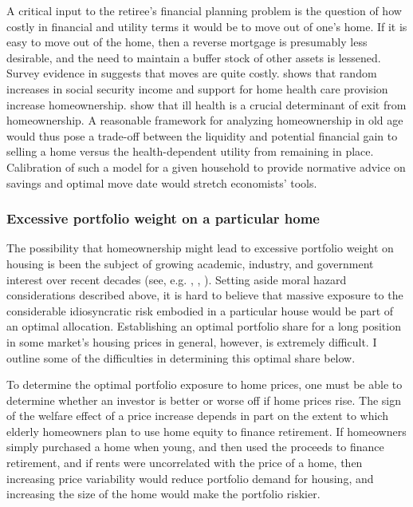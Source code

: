 \documentclass[12pt]{article}
\begin{document}
A critical input to the retiree's financial planning problem is the question of
how costly in financial and utility terms it would be to move out of one's home.
If it is easy to move out of the home, then a reverse mortgage is presumably
less desirable, and the need to maintain a buffer stock of other assets is
lessened.  Survey evidence in \textcite{AARP} suggests that moves are quite costly.
\textcite{engelhardtPerry} shows that random increases in social security income and support
for home health care provision increase homeownership. \textcite{CoileMilligan}
show that ill health is a crucial determinant of exit from homeownership.  A
reasonable framework for analyzing homeownership in old age would thus pose
a trade-off between the liquidity and potential financial gain to selling a home
versus the health-dependent utility from remaining in place.  Calibration of
such a model for a given household to provide normative advice on savings and
optimal move date would stretch economists' tools.

\subsubsection{Excessive portfolio weight on a particular home}

The possibility that homeownership might lead to excessive portfolio weight on
housing is been the subject of growing academic, industry, and government interest over
recent decades (see, e.g.  \textcite{FlavinYamashita}, \textcite{Brueckner},
\textcite{Bula}).  Setting aside moral hazard considerations described above,
it is hard to believe that massive exposure to the considerable idiosyncratic
risk embodied in a particular house would be part of an optimal allocation.
Establishing an optimal portfolio share for a long position in some market's
housing prices in general, however, is extremely difficult. I outline some of
the difficulties in determining this optimal share below.

To determine the optimal portfolio exposure to home prices, one must be able to
determine whether an investor is better or worse off if home prices rise.  The
sign of the welfare effect of a price increase depends in part on the extent to
which elderly homeowners plan to use home equity to finance retirement.  If
homeowners simply purchased a home when young, and then used the proceeds to
finance retirement, and if rents were uncorrelated with the price of a home,
then increasing price variability would reduce portfolio demand for housing, and
increasing the size of the home would make the portfolio riskier.  
\end{document}
